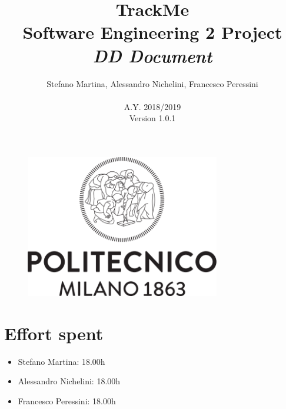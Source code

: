 \documentclass{article}
\begin{document}
	\begin{figure}[t]
	\centering
	\includegraphics[height=6.25cm,keepaspectratio]{Figures/logo}
	\end{figure}
	
	\title{TrackMe \\ Software Engineering 2 Project \\ 
			\textit{DD Document}}
	\author{Stefano Martina, Alessandro Nichelini, Francesco Peressini
		\\ \\ A.Y. 2018/2019 \\ Version 1.0.1}
		
\maketitle
\newpage

\tableofcontents
\newpage






\section{Effort spent}
\begin{itemize}
	\item Stefano Martina: 18.00h
	\item Alessandro Nichelini: 18.00h
	\item Francesco Peressini: 18.00h
\end{itemize}
\end{document}
